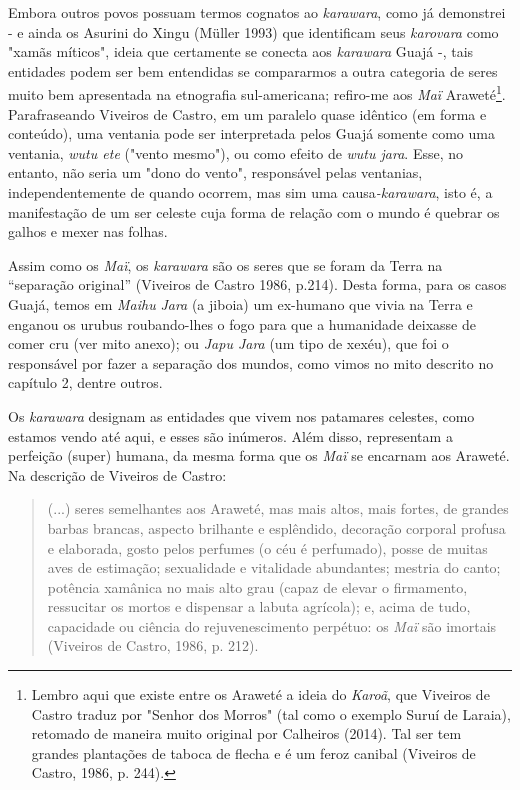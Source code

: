 Embora outros povos possuam termos cognatos ao \emph{karawara}, como já
demonstrei - e ainda os Asurini do Xingu (Müller 1993) que identificam
seus \emph{karovara} como "xamãs míticos", ideia que certamente se
conecta aos \emph{karawara} Guajá -, tais entidades podem ser bem
entendidas se compararmos a outra categoria de seres muito bem
apresentada na etnografia sul-americana; refiro-me aos \emph{Maï}
Araweté\footnote{Lembro aqui que existe entre os Araweté a ideia do
  \emph{Karoã}, que Viveiros de Castro traduz por "Senhor dos Morros"
  (tal como o exemplo Suruí de Laraia), retomado de maneira muito
  original por Calheiros (2014). Tal ser tem grandes plantações de
  taboca de flecha e é um feroz canibal (Viveiros de Castro, 1986, p.
  244).}. Parafraseando Viveiros de Castro, em um paralelo quase
idêntico (em forma e conteúdo), uma ventania pode ser interpretada pelos
Guajá somente como uma ventania, \emph{wutu ete} ("vento mesmo"), ou
como efeito de \emph{wutu jara}. Esse, no entanto, não seria um "dono do
vento", responsável pelas ventanias, independentemente de quando
ocorrem, mas sim uma causa\emph{-karawara}, isto é, a manifestação de um
ser celeste cuja forma de relação com o mundo é quebrar os galhos e
mexer nas folhas.

Assim como os \emph{Maï}, os \emph{karawara} são os seres que se foram
da Terra na ``separação original'' (Viveiros de Castro 1986, p.214).
Desta forma, para os casos Guajá, temos em \emph{Maihu} \emph{Jara} (a
jiboia) um ex-humano que vivia na Terra e enganou os urubus
roubando-lhes o fogo para que a humanidade deixasse de comer cru (ver
mito anexo); ou \emph{Japu Jara} (um tipo de xexéu), que foi o
responsável por fazer a separação dos mundos, como vimos no mito
descrito no capítulo 2, dentre outros.

Os \emph{karawara} designam as entidades que vivem nos patamares
celestes, como estamos vendo até aqui, e esses são inúmeros. Além disso,
representam a perfeição (super) humana, da mesma forma que os \emph{Maï}
se encarnam aos Araweté. Na descrição de Viveiros de Castro:

\begin{quote}
(...) seres semelhantes aos Araweté, mas mais altos, mais fortes, de
grandes barbas brancas, aspecto brilhante e esplêndido, decoração
corporal profusa e elaborada, gosto pelos perfumes (o céu é perfumado),
posse de muitas aves de estimação; sexualidade e vitalidade abundantes;
mestria do canto; potência xamânica no mais alto grau (capaz de elevar o
firmamento, ressucitar os mortos e dispensar a labuta agrícola); e,
acima de tudo, capacidade ou ciência do rejuvenescimento perpétuo: os
\emph{Maï} são imortais (Viveiros de Castro, 1986, p. 212).
\end{quote}

